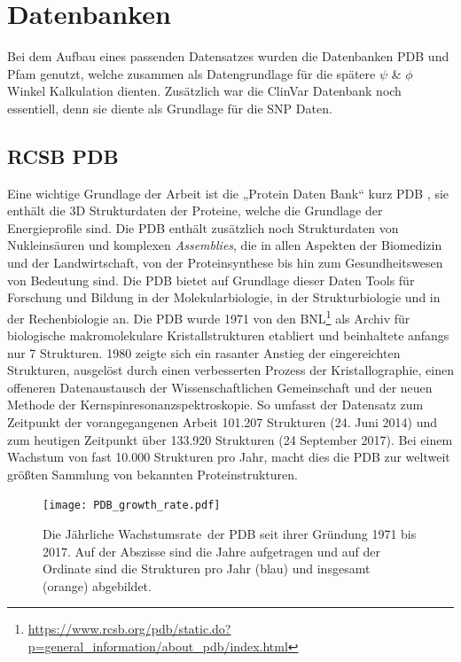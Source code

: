 \newpage
\section{Datenbanken}
Bei dem Aufbau eines passenden Datensatzes wurden die Datenbanken \ac{PDB} und \ac{Pfam} genutzt, welche zusammen als Datengrundlage für die spätere $\psi$ \& $\phi$ Winkel Kalkulation dienten. Zusätzlich war die ClinVar Datenbank noch essentiell, denn sie diente als Grundlage für die \ac{SNP} Daten.


\subsection{RCSB PDB}

Eine wichtige Grundlage der Arbeit ist die „Protein Daten Bank“ kurz PDB \cite{Bernstein.1977}, sie enthält die 3D Strukturdaten der Proteine, welche die Grundlage der Energieprofile sind. Die \ac{PDB} enthält zusätzlich noch Strukturdaten von Nukleinsäuren und komplexen \emph{Assemblies}, die in allen Aspekten der Biomedizin und der Landwirtschaft, von der Proteinsynthese bis hin zum Gesundheitswesen von Bedeutung sind. Die \ac{PDB} bietet auf Grundlage dieser Daten Tools für Forschung und Bildung in der Molekularbiologie, in der Strukturbiologie und in der Rechenbiologie an.
Die \ac{PDB} wurde 1971 von den \ac{BNL}\footnote{\url{https://www.rcsb.org/pdb/static.do?p=general_information/about_pdb/index.html}} als Archiv für biologische makromolekulare Kristallstrukturen etabliert und beinhaltete anfangs nur 7 Strukturen. 1980 zeigte sich ein rasanter Anstieg der eingereichten Strukturen, ausgelöst durch einen verbesserten Prozess der Kristallographie, einen offeneren Datenaustausch der Wissenschaftlichen Gemeinschaft und der neuen Methode der Kernspinresonanzspektroskopie. So umfasst der Datensatz zum Zeitpunkt der vorangegangenen Arbeit 101.207 Strukturen (24. Juni 2014) und zum heutigen Zeitpunkt über 133.920 Strukturen (24 September 2017). Bei einem Wachstum von fast 10.000 Strukturen pro Jahr, macht dies die \ac{PDB} zur weltweit größten Sammlung von bekannten Proteinstrukturen.

\begin{figure}
\texttt{[image: PDB\_growth\_rate.pdf]}
\caption{Die Jährliche Wachstumsrate\protect\footnotemark \ der \ac{PDB} seit ihrer Gründung 1971 bis 2017. Auf der Abszisse sind die Jahre aufgetragen und auf der Ordinate sind die Strukturen pro Jahr (blau) und insgesamt (orange) abgebildet.}
\label{fig:PDB_growth_rate}
\end{figure}

